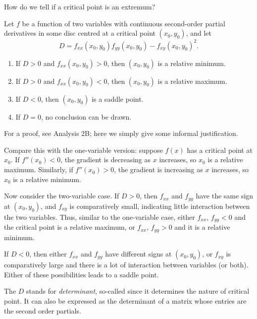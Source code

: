   How do we tell if a critical point is an extremum?

  \begin{theorem}
    Let $f$ be a function of two variables with continuous second-order partial derivatives in some disc centred at a critical point $(x_0, y_0)$, and let
    \[
      D = f_{xx}(x_0, y_0)f_{yy}(x_0, y_0) - f_{xy}(x_0, y_0)^2.
    \]
    \begin{enumerate}[label=(\alph*)]
      \item If $D > 0$ and $f_{xx}(x_0, y_0) > 0$, then $(x_0, y_0)$ is a relative minimum.
      \item If $D > 0$ and $f_{xx}(x_0, y_0) < 0$, then $(x_0, y_0)$ is a relative maximum.
      \item If $D < 0$, then $(x_0, y_0)$ is a saddle point.
      \item If $D = 0$, no conclusion can be drawn.
    \end{enumerate}
  \end{theorem}
	
	For a proof, see Analysis 2B; here we simply give some informal justification.
	
	Compare this with the one-variable version: suppose $f(x)$ has a critical point at $x_0$.  If $f''(x_0) < 0$, the gradient is decreasing as $x$ increases, so $x_0$ is a relative maximum.  Similarly, if $f''(x_0) > 0$, the gradient is increasing as $x$ increases, so $x_0$ is a relative minimum.
	
	Now consider the two-variable case.  If $D > 0$, then $f_{xx}$ and $f_{yy}$ have the same sign at $(x_0, y_0)$, and $f_{xy}$ is comparatively small, indicating little interaction between the two variables.  Thus, similar to the one-variable case, either $f_{xx}$, $f_{yy} < 0$ and the critical point is a relative maximum, or $f_{xx}$, $f_{yy} > 0$ and it is a relative minimum.
	
	If $D < 0$, then either $f_{xx}$ and $f_{yy}$ have different signs at $(x_0, y_0)$, or $f_{xy}$ is comparatively large and there is a lot of interaction between variables (or both).  Either of these possibilities leads to a saddle point.

  \begin{note}
    The $D$ stands for \emph{determinant}, so-called since it determines the nature of critical point.  It can also be expressed as the determinant of a matrix whose entries are the second order partials.
  \end{note}


